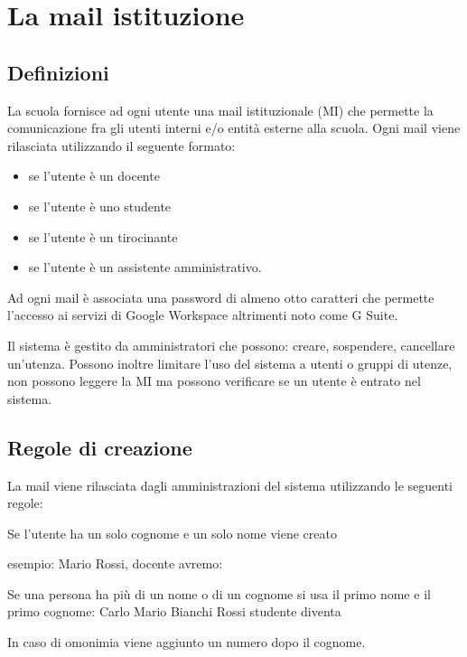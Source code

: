 \chapter{La mail istituzione}
\printpartialtoc
\section{Definizioni}
La scuola fornisce ad ogni utente una mail istituzionale (MI) che permette 
la comunicazione fra gli utenti interni e/o entità esterne alla scuola.
Ogni mail viene rilasciata utilizzando il seguente formato:
\begin{itemize}
	\item {} se l'utente è un docente
	\item {} se l'utente è uno studente
	\item {} se l'utente è un 
	tirocinante
	\item {} se l'utente è un 
	assistente 
	amministrativo.
\end{itemize}

Ad ogni mail è associata una password di almeno otto caratteri che permette 
l'accesso ai servizi di  \textenglish{Google Workspace} altrimenti noto come \textenglish{G Suite}.

Il sistema è gestito da amministratori che possono: creare, sospendere, cancellare un'utenza. Possono inoltre limitare l'uso del sistema a utenti o gruppi di utenze, non possono leggere la MI ma possono verificare se un utente è entrato nel sistema.

\section{Regole di creazione} 
La mail viene rilasciata dagli amministrazioni del sistema utilizzando le seguenti 
regole:

Se l'utente ha un solo cognome e un solo nome viene creato
\begin{center}
\end{center}
esempio: Mario Rossi, docente avremo:
\begin{center}
\end{center}
Se una persona ha più di un nome o di un cognome si usa il primo nome e il  
primo cognome: Carlo Mario Bianchi Rossi studente diventa
\begin{center}
\end{center}
In caso di omonimia viene aggiunto un numero dopo il cognome.
